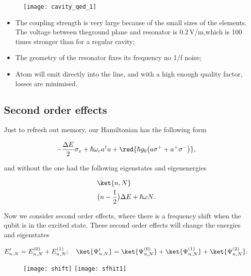 \begin{figure}[h]
  \centering \texttt{[image: cavity\_qed\_1]}
\end{figure}

\noindent
\begin{itemize}
\item The coupling strength is very  large because of the small sizes
  of the elements.  The voltage between theground plane and resonator
  is 0.2\,V/m,which is 100 times stronger than for a regular cavity;
\item The geometry  of the resonator fixes its frequency  \ira no 1/f
  noise;
\item Atom will  emit directly into the line, and  with a high enough
  quality factor, losses are minimised.
\end{itemize}

\subsection{Second order effects}
Just to refresh out memory, our Hamiltonian has the following form

\begin{equation}\label{sec}
  -\frac{\Delta E}{2}\sigma_x + \hbar\omega_ra^{\dagger}a + \red{\hbar g_0\big(a\sigma^{+}+a^{+}\sigma^{-}\big)},
\end{equation}

\noindent  and  without  the     one  had  the
following eigenstates and eigenenergies

\begin{equation}\label{secStates}
  \begin{aligned}
    &\ket{n,N}\\
    &\big(n-\frac{1}{2}\big)\Delta E + \hbar\omega N.
  \end{aligned}
\end{equation}

\noindent  Now we  consider second  order effects,  where there  is a
frequency shift when the qubit is in the excited state.  These second
order effects will change the energies and eigenstates

\begin{equation}\label{secEi}
  E'_{n,N} = E_{n,N}^{(0)} + E_{n,N}^{(1)};\quad \ket{\Psi'_{n,N}}=\ket{\Psi^{(0)}_{n,N}}+\ket{\Psi^{(1)}_{n,N}}+\ket{\Psi^{(2)}_{n,N}}.
\end{equation}


\begin{figure}[h]
  \centering%
  \texttt{[image: shift]}
  \texttt{[image: sfhit1]}
\end{figure}

